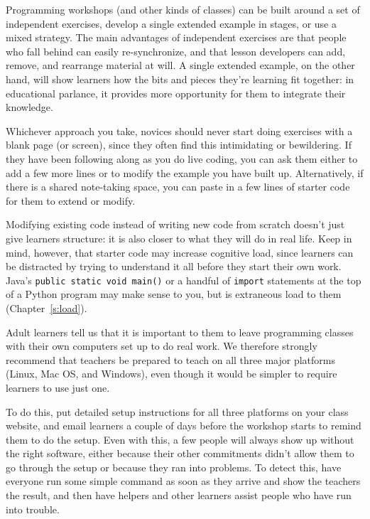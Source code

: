 
Programming workshops (and other kinds of classes) can be built around a
set of independent exercises, develop a single extended example in
stages, or use a mixed strategy. The main advantages of independent
exercises are that people who fall behind can easily re-synchronize, and
that lesson developers can add, remove, and rearrange material at will.
A single extended example, on the other hand, will show learners how the
bits and pieces they're learning fit together: in educational parlance,
it provides more opportunity for them to integrate their knowledge.

Whichever approach you take, novices should never start doing exercises
with a blank page (or screen), since they often find this intimidating
or bewildering. If they have been following along as you do live coding,
you can ask them either to add a few more lines or to modify the example
you have built up. Alternatively, if there is a shared note-taking
space, you can paste in a few lines of starter code for them to extend
or modify.

Modifying existing code instead of writing new code from scratch doesn't
just give learners structure: it is also closer to what they will do in
real life. Keep in mind, however, that starter code may increase
cognitive load, since learners can be distracted by trying to understand
it all before they start their own work. Java's \texttt{public\ static\ void\ main()} or a handful of \texttt{import} statements at the top of a Python
program may make sense to you, but is extraneous load to them
(Chapter~\ref{s:load}).


Adult learners tell us that it is important to them to leave programming
classes with their own computers set up to do real work. We therefore
strongly recommend that teachers be prepared to teach on all three major
platforms (Linux, Mac OS, and Windows), even though it would be simpler
to require learners to use just one.

To do this, put detailed setup instructions for all three platforms on
your class website, and email learners a couple of days before the
workshop starts to remind them to do the setup. Even with this, a few
people will always show up without the right software, either because
their other commitments didn't allow them to go through the setup or
because they ran into problems. To detect this, have everyone run some
simple command as soon as they arrive and show the teachers the result,
and then have helpers and other learners assist people who have run into
trouble.

